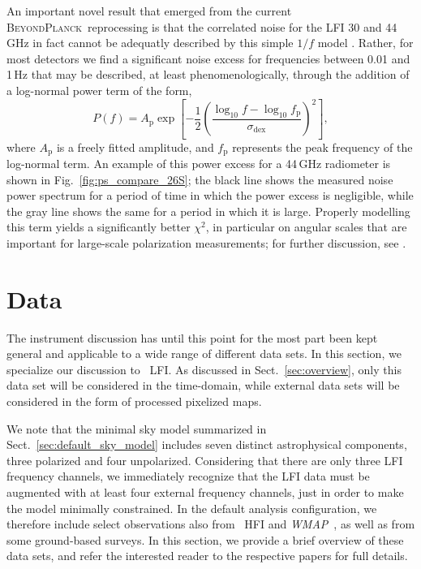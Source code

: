\documentclass[onecolumn]{aa}
\def\WMAP{\emph{WMAP}}
\newcommand{\BP}{\textsc{BeyondPlanck}}
\begin{document}
An important novel result that emerged from the current
\BP\ reprocessing is that the correlated noise for the LFI 30 and
44\,GHz in fact cannot be adequatly described by this simple $1/f$
model \citep{bp06}. Rather, for most detectors we find a significant
noise excess for frequencies between 0.01 and 1\,Hz that may
be described, at least phenomenologically, through the addition of a
log-normal power term of the form,
\begin{equation}
  P(f) = A_\mathrm{p}
    \exp\left[-\frac{1}{2}\left(\frac{\log_{10}f - \log_{10} f_\mathrm{p}}{\sigma_\mathrm{dex}}\right)^2\right],
    \label{eq:1fmodel_lognorm}
\end{equation} 
where $A_{\mathrm{p}}$ is a freely fitted amplitude, and
$f_\mathrm{p}$ represents the peak frequency of the log-normal
term. An example of this power excess for a 44\,GHz radiometer is
shown in Fig.~\ref{fig:ps_compare_26S}; the black line shows the
measured noise power spectrum for a period of time in which the power
excess is negligible, while the gray line shows the same for a period
in which it is large. Properly modelling this term yields a
significantly better $\chi^2$, in particular on angular scales that
are important for large-scale polarization measurements; for further
discussion, see \citet{bp06}.

\section{Data}
\label{sec:data}

The instrument discussion has until this point for the most part been
kept general and applicable to a wide range of different data sets. In
this section, we specialize our discussion to \Planck\ LFI. As
discussed in Sect.~\ref{sec:overview}, only this data set will be
considered in the time-domain, while external data sets will be
considered in the form of processed pixelized maps.

We note that the minimal sky model summarized in
Sect.~\ref{sec:default_sky_model} includes seven distinct
astrophysical components, three polarized and four
unpolarized. Considering that there are only three LFI frequency
channels, we immediately recognize that the LFI data must be augmented
with at least four external frequency channels, just in order to make
the model minimally constrained. In the default analysis
configuration, we therefore include select observations also from
\Planck\ HFI \citep{planck2020-LVII} and \WMAP\ \citep{bennett2012}, as well as
from some ground-based surveys. In this section, we provide a brief
overview of these data sets, and refer the interested reader to the
respective papers for full details.
\end{document}
